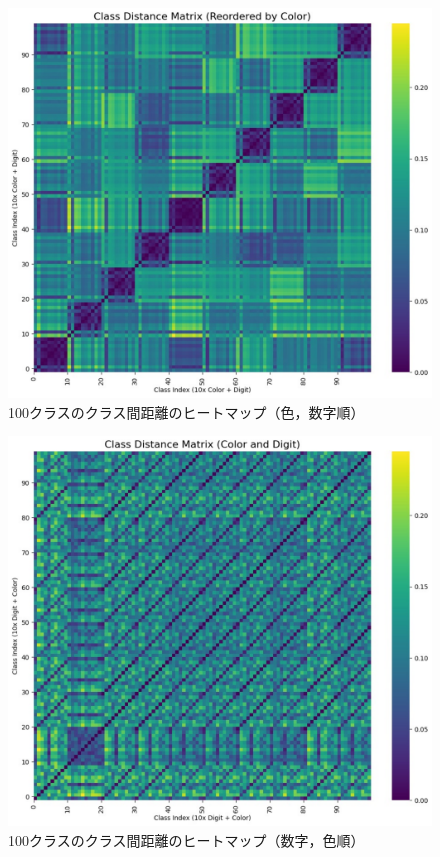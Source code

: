 \begin{figure}[H]
    \centering
    \includegraphics[width=\linewidth]{fig/distance_matrix_heatmap_by_color.pdf}
    \caption{100クラスのクラス間距離のヒートマップ（色，数字順）}
    \label{fig:distance_matrix_heatmap_by_color}
\end{figure}

\begin{figure}[H]
    \centering
    \includegraphics[width=\linewidth]{fig/distance_matrix_heatmap.pdf}
    \caption{100クラスのクラス間距離のヒートマップ（数字，色順）}
    \label{fig:distance_matrix_heatmap_by_digit}
\end{figure}

